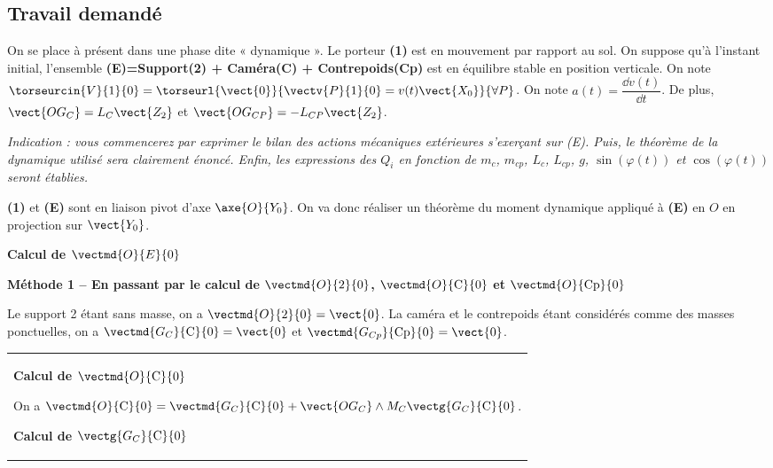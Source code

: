 \begin{multicols}{2}
\subsection*{Travail demandé}
\ifprof
\else
On se place à présent dans une phase dite « dynamique ». Le porteur \textbf{(1)} est en mouvement par rapport au sol. On suppose qu'à l'instant initial, l'ensemble \textbf{(E)=Support(2) + Caméra(C) + Contrepoids(Cp)} est en équilibre stable en position verticale. On note $\torseurcin{V}{1}{0}=\torseurl{\vect{0}}{\vectv{P}{1}{0}=v(t)\vect{X_0}}{\forall P}$.
On note $a(t)=\dfrac{\dd v(t)}{\dd t}$. De plus, $\vect{OG_C}=L_C\vect{Z_2}$ et $\vect{OG_{CP}}=-L_{CP}\vect{Z_2}$.
\fi


\ifdifficile
\ifprof
\else
\textit{Indication : vous commencerez par exprimer le bilan des actions mécaniques extérieures s’exerçant sur (E). Puis,
le théorème de la dynamique utilisé sera clairement énoncé. Enfin, les expressions des $Q_i$ en fonction de $m_c$,
$m_{cp}$, $L_c$, $L_{cp}$, $g$, $\sin\left(\varphi(t)\right)$ et $\cos\left(\varphi(t)\right)$ seront établies.}
\fi

\else
\fi


\ifprof
\begin{corrige}
\textbf{(1)} et \textbf{(E)} sont en liaison pivot d'axe $\axe{O}{Y_0}$. On va donc réaliser un théorème du moment dynamique appliqué à \textbf{(E)} en $O$ en projection sur $\vect{Y_0}$. 

\textbf{Calcul de $\vectmd{O}{E}{0}$}

\textbf{Méthode 1 -- En passant par le calcul de $\vectmd{O}{\text{2}}{0}$, $\vectmd{O}{\text{C}}{0}$ et $\vectmd{O}{\text{Cp}}{0}$}


Le support 2 étant sans masse, on a $\vectmd{O}{\text{2}}{0}=\vect{0}$. La caméra et le contrepoids étant considérés comme des masses ponctuelles, on a $\vectmd{G_C}{\text{C}}{0}=\vect{0}$ et $\vectmd{G_{Cp}}{\text{Cp}}{0}=\vect{0}$.

 \begin{tabular}{|p{.9\linewidth}}
\textbf{Calcul de $\vectmd{O}{\text{C}}{0}$}

 On a $\vectmd{O}{\text{C}}{0} = \vectmd{G_{C}}{\text{C}}{0}+\vect{OG_C} \wedge M_C\vectg{G_{C}}{\text{C}}{0}$.
 
\textbf{Calcul de $\vectg{G_{C}}{\text{C}}{0}$}


\end{tabular}
\end{corrige}
\end{multicols}
